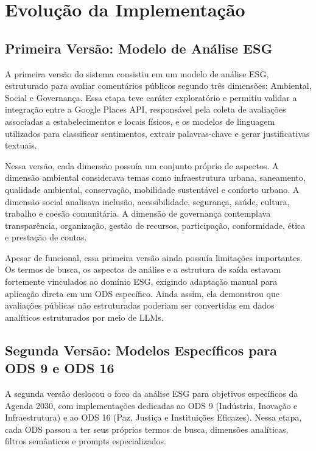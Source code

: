 \section{Evolução da Implementação}
\label{sec:evolucao}

\subsection{Primeira Versão: Modelo de Análise ESG}
\label{subsec:v1}

A primeira versão do sistema consistiu em um modelo de análise ESG, estruturado para avaliar comentários públicos segundo três dimensões: Ambiental, Social e Governança. Essa etapa teve caráter exploratório e permitiu validar a integração entre a Google Places API, responsável pela coleta de avaliações associadas a estabelecimentos e locais físicos, e os modelos de linguagem utilizados para classificar sentimentos, extrair palavras-chave e gerar justificativas textuais.

Nessa versão, cada dimensão possuía um conjunto próprio de aspectos. A dimensão ambiental considerava temas como infraestrutura urbana, saneamento, qualidade ambiental, conservação, mobilidade sustentável e conforto urbano. A dimensão social analisava inclusão, acessibilidade, segurança, saúde, cultura, trabalho e coesão comunitária. A dimensão de governança contemplava transparência, organização, gestão de recursos, participação, conformidade, ética e prestação de contas.

Apesar de funcional, essa primeira versão ainda possuía limitações importantes. Os termos de busca, os aspectos de análise e a estrutura de saída estavam fortemente vinculados ao domínio ESG, exigindo adaptação manual para aplicação direta em um ODS específico. Ainda assim, ela demonstrou que avaliações públicas não estruturadas poderiam ser convertidas em dados analíticos estruturados por meio de \glspl{LLM}.

\subsection{Segunda Versão: Modelos Específicos para ODS 9 e ODS 16}
\label{subsec:v2}

A segunda versão deslocou o foco da análise ESG para objetivos específicos da Agenda 2030, com implementações dedicadas ao ODS 9 (Indústria, Inovação e Infraestrutura) e ao ODS 16 (Paz, Justiça e Instituições Eficazes). Nessa etapa, cada ODS passou a ter seus próprios termos de busca, dimensões analíticas, filtros semânticos e prompts especializados.

